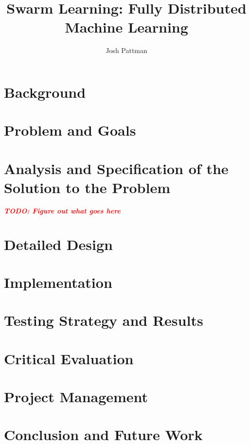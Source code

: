 \documentclass[12pt,a4paper]{report}
\author{Josh Pattman}
\title{Swarm Learning: Fully Distributed Machine Learning}
\newcommand{\todo}[1]{\textcolor{red}{\textbf{\emph{TODO: #1}}}}
\begin{document}
	\maketitle
	\tableofcontents

	\chapter{Background}
	

	\chapter{Problem and Goals}
	
	
	\chapter{Analysis and Specification of the Solution to the Problem}
	\todo{Figure out what goes here}
	
	\chapter{Detailed Design}
	
	
	\chapter{Implementation}
	
	
	\chapter{Testing Strategy and Results}
	
	
	\chapter{Critical Evaluation}
	
	
	\chapter{Project Management}
	
	
	\chapter{Conclusion and Future Work}
	
	
	
	
	{}
	
\end{document}
